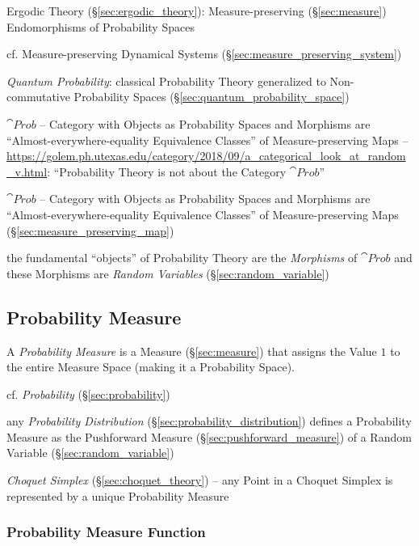 \fist Ergodic Theory (\S\ref{sec:ergodic_theory}): Measure-preserving
(\S\ref{sec:measure}) Endomorphisms of Probability Spaces

\fist cf. Measure-preserving Dynamical Systems
(\S\ref{sec:measure_preserving_system})

\fist \emph{Quantum Probability}: classical Probability Theory generalized to
Non-commutative Probability Spaces (\S\ref{sec:quantum_probability_space})

$\cat{Prob}$ -- Category with Objects as Probability Spaces and Morphisms are
``Almost-everywhere-equality Equivalence Classes'' of Measure-preserving Maps
--
\url{https://golem.ph.utexas.edu/category/2018/09/a_categorical_look_at_random_v.html}:
``Probability Theory is not about the Category $\cat{Prob}$''

$\cat{Prob}$ -- Category with Objects as Probability Spaces and Morphisms are
``Almost-everywhere-equality Equivalence Classes'' of Measure-preserving Maps
(\S\ref{sec:measure_preserving_map})

the fundamental ``objects'' of Probability Theory are the \emph{Morphisms} of
$\cat{Prob}$ and these Morphisms are \emph{Random Variables}
(\S\ref{sec:random_variable})



\subsection{Probability Measure}\label{sec:probability_measure}

A \emph{Probability Measure} is a Measure (\S\ref{sec:measure}) that assigns the
Value $1$ to the entire Measure Space (making it a Probability Space).

cf. \emph{Probability} (\S\ref{sec:probability})

\fist any \emph{Probability Distribution} (\S\ref{sec:probability_distribution})
defines a Probability Measure as the Pushforward Measure
(\S\ref{sec:pushforward_measure}) of a Random Variable
(\S\ref{sec:random_variable})

\emph{Choquet Simplex} (\S\ref{sec:choquet_theory}) -- any Point in a Choquet
Simplex is represented by a unique Probability Measure



\subsubsection{Probability Measure Function}
\label{sec:probability_measure_function}

